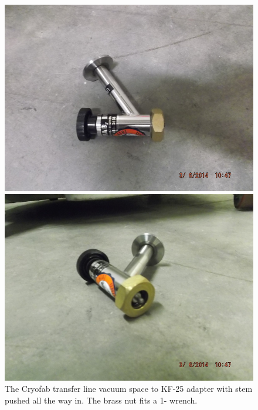 \begin{figure}[h]
 \centering
 \begin{minipage}{.45\textwidth}
 \includegraphics[width=\textwidth]{./img/cf-adapter.JPG}
 \end{minipage}
 \quad
  \begin{minipage}{.45\textwidth}
 \includegraphics[width=\textwidth]{./img/cf-adapter-angle.JPG}
 \end{minipage}
 \caption{The Cryofab transfer line vacuum space to KF-25 adapter with stem pushed all the way in.  The brass nut fits a 1-\inches{} wrench.}
 \label{fig:cf-adapter}

\end{figure}

